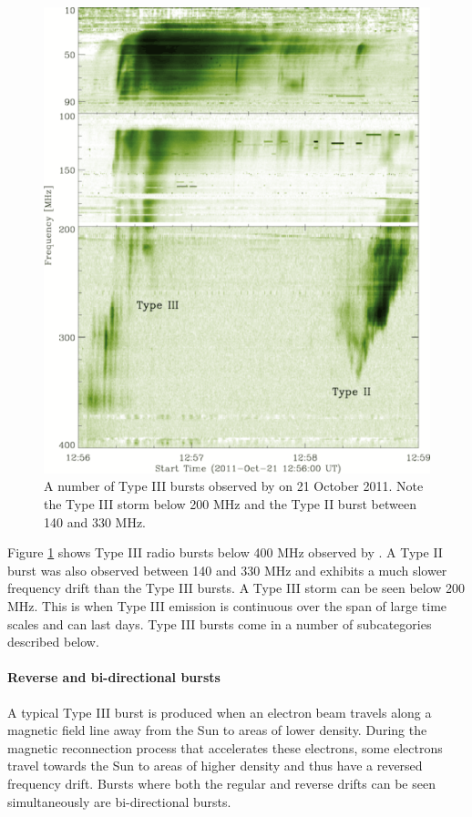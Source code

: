 \begin{figure}
    \centering
    \includegraphics[width=0.5\columnwidth]{Images/Pietro_typeIII.png}
    \caption[A number of Type III bursts observed by \cite{Zucca2012} on 21 October 2011.]{A number of Type III bursts observed by \cite{Zucca2012} on 21 October 2011. Note the Type III storm below 200 MHz and the Type II burst between 140 and 330 MHz.}
    \label{fig:bursts}
\end{figure}

Figure \ref{fig:bursts} shows Type III radio bursts below 400 MHz observed by \cite{Zucca2012}. A Type II burst was also observed between 140 and 330 MHz and exhibits a much slower frequency drift than the Type III bursts. A Type III storm can be seen below 200 MHz. This is when Type III emission is continuous over the span of large time scales and can last days. Type III bursts come in a number of subcategories described below.


\paragraph{Reverse and bi-directional bursts}
A typical Type III burst is produced when an electron beam travels along a magnetic field line away from the Sun to areas of lower density. During the magnetic reconnection process that accelerates these electrons, some electrons travel towards the Sun to areas of higher density and thus have a reversed frequency drift. Bursts where both the regular and reverse drifts can be seen simultaneously are bi-directional bursts.

